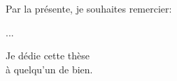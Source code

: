 \documentclass[11pt]{template/thesul}
\begin{document}
\begin{ThesisAcknowledgments}

    Par la présente, je souhaites remercier:
    \begin{todolist}
        \item ...
    \end{todolist}

\end{ThesisAcknowledgments}


\begin{ThesisDedication}

    Je dédie cette thèse\\
    à quelqu'un de bien.

\end{ThesisDedication}


\renewcommand{\contentsname}{Table des matières}
\tableofcontents


\mainmatter








\end{document}
